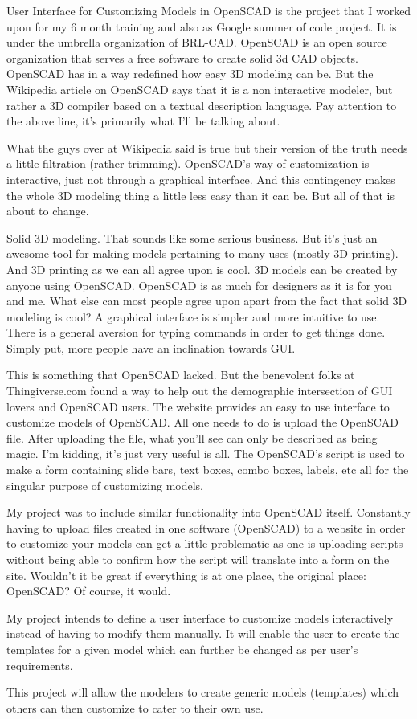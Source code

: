 \begin{Large}
\end{Large}

User Interface for Customizing Models in OpenSCAD is the project that I worked upon for my 6 month training and also as Google summer of code project. It is under the umbrella organization of BRL-CAD. OpenSCAD is an open source organization that serves a free software to create solid 3d CAD objects. OpenSCAD has in a way redefined how easy 3D modeling can be. But the Wikipedia article on OpenSCAD says that it is a non interactive modeler, but rather a 3D compiler based on a textual description language. Pay attention to the above line, it’s primarily what I’ll be talking about.

What the guys over at Wikipedia said is true but their version of the truth needs a little filtration (rather trimming). OpenSCAD’s way of customization is interactive, just not through a graphical interface. And this contingency makes the whole 3D modeling thing a little less easy than it can be. But all of that is about to change.

Solid 3D modeling. That sounds like some serious business. But it’s just an awesome tool for making models pertaining to many uses (mostly 3D printing). And 3D printing as we can all agree upon is cool. 3D models can be created by anyone using OpenSCAD. OpenSCAD is as much for designers as it is for you and me. What else can most people agree upon apart from the fact that solid 3D modeling is cool? A graphical interface is simpler and more intuitive to use. There is a general aversion for typing commands in order to get things done. Simply put, more people have an inclination towards GUI.

This is something that OpenSCAD lacked. But the benevolent folks at Thingiverse.com found a way to help out the demographic intersection of GUI lovers and OpenSCAD users. The website provides an easy to use interface to customize models of OpenSCAD. All one needs to do is upload the OpenSCAD file. After uploading the file, what you’ll see can only be described as being magic. I’m kidding, it’s just very useful is all. The OpenSCAD’s script is used to make a form containing slide bars, text boxes, combo boxes, labels, etc all for the singular purpose of customizing models.

My project was to include similar functionality into OpenSCAD itself. Constantly having to upload files created in one software (OpenSCAD) to a website in order to customize your models can get a little problematic as one is uploading scripts without being able to confirm how the script will translate into a form on the site. Wouldn’t it be great if everything is at one place, the original place: OpenSCAD? Of course, it would.

My project intends to define a user interface to customize models interactively instead of having to modify them manually. It will enable the user to create the templates for a given model which can further be changed as per user’s requirements.

This project will allow the modelers to create generic models (templates) which others can then customize to cater to their own use.